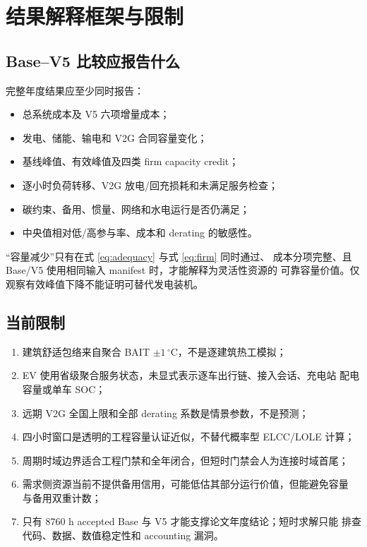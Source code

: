 \documentclass[UTF8,fontset=fandol,12pt]{ctexart}
\begin{document}
\section{结果解释框架与限制}

\subsection{Base--V5 比较应报告什么}

完整年度结果应至少同时报告：
\begin{itemize}
  \item 总系统成本及 V5 六项增量成本；
  \item 发电、储能、输电和 V2G 合同容量变化；
  \item 基线峰值、有效峰值及四类 firm capacity credit；
  \item 逐小时负荷转移、V2G 放电/回充损耗和未满足服务检查；
  \item 碳约束、备用、惯量、网络和水电运行是否仍满足；
  \item 中央值相对低/高参与率、成本和 derating 的敏感性。
\end{itemize}
``容量减少''只有在式 \eqref{eq:adequacy} 与式 \eqref{eq:firm} 同时通过、
成本分项完整、且 Base/V5 使用相同输入 manifest 时，才能解释为灵活性资源的
可靠容量价值。仅观察有效峰值下降不能证明可替代发电装机。

\subsection{当前限制}

\begin{enumerate}
  \item 建筑舒适包络来自聚合 BAIT $\pm1\,^{\circ}$C，不是逐建筑热工模拟；
  \item EV 使用省级聚合服务状态，未显式表示逐车出行链、接入会话、充电站
  配电容量或单车 SOC；
  \item 远期 V2G 全国上限和全部 derating 系数是情景参数，不是预测；
  \item 四小时窗口是透明的工程容量认证近似，不替代概率型 ELCC/LOLE 计算；
  \item 周期时域边界适合工程门禁和全年闭合，但短时门禁会人为连接时域首尾；
  \item 需求侧资源当前不提供备用信用，可能低估其部分运行价值，但能避免容量
  与备用双重计数；
  \item 只有 8760 h accepted Base 与 V5 才能支撑论文年度结论；短时求解只能
  排查代码、数据、数值稳定性和 accounting 漏洞。
\end{enumerate}
\end{document}
